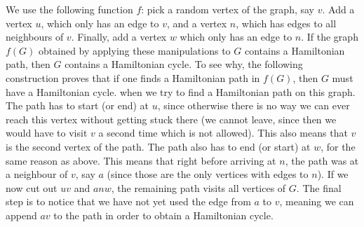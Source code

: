 \begin{solution}
\begin{enumerate}
		We use the following function \(f\):
		pick a random vertex of the graph, say \(v\).
		Add a vertex \(u\), which only has an edge to \(v\),
		and a vertex \(n\), which has edges to all neighbours of \(v\).
		Finally, add a vertex \(w\) which only has an edge to \(n\).
		If the graph \(f(G)\) obtained
		by applying these manipulations
		to \(G\) contains a Hamiltonian path,
		then \(G\) contains a Hamiltonian cycle.
		To see why, the following construction proves
		that if one finds a Hamiltonian path in \(f(G)\),
		then \(G\) must have a Hamiltonian cycle.
		when we try to find a Hamiltonian path on this graph.
		The path has to start (or end) at \(u\),
		since otherwise there is no way we can ever reach this vertex
		without getting stuck there (we cannot leave,
		since then we would have to visit \(v\) a second time
		which is not allowed).
		This also means that \(v\) is the second vertex of the path.
		The path also has to end (or start) at \(w\),
		for the same reason as above.
		This means that right before arriving at \(n\),
		the path was at a neighbour of \(v\), say \(a\)
		(since those are the only vertices with edges to \(n\)).
		If we now cut out \(uv\) and \(anw\),
		the remaining path visits all vertices of \(G\).
		The final step is to notice that we have not yet used
		the edge from \(a\) to \(v\),
		meaning we can append \(av\) to the path
		in order to obtain a Hamiltonian cycle.
	\end{enumerate}
\end{solution}
